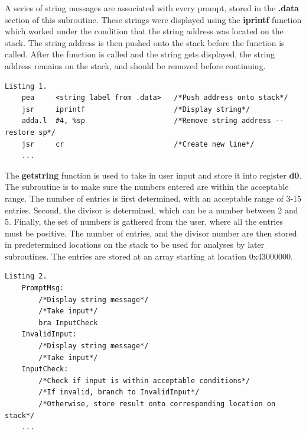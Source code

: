 \documentclass[12pt]{article}
\begin{document}
A series of string messages are associated with every prompt, stored in the \textbf{.data} section of this subroutine. These strings were displayed using the \textbf{iprintf} function which worked under the condition that the string address was located on the stack. The string address is then pushed onto the stack before the function is called. After the function is called and the string gets displayed, the string address remains on the stack, and should be removed before continuing.

\begin{verbatim}
Listing 1.
    pea     <string label from .data>   /*Push address onto stack*/
    jsr     iprintf                     /*Display string*/
    adda.l  #4, %sp                     /*Remove string address -- restore sp*/
    jsr     cr                          /*Create new line*/
    ...
\end{verbatim}

The \textbf{getstring} function is used to take in user input and store it into register \textbf{d0}. The subroutine is to make sure the numbers entered are within the acceptable range. The number of entries is first determined, with an acceptable range of 3-15 entries. Second, the divisor is determined, which can be a number between 2 and 5. Finally, the set of numbers is gathered from the user, where all the entries must be positive. The number of entries, and the divisor number are then stored in predetermined locations on the stack to be used for analyses by later subroutines. The entries are stored at an array starting at location 0x43000000.

\begin{verbatim}
Listing 2.
    PromptMsg:
        /*Display string message*/
        /*Take input*/
        bra InputCheck
    InvalidInput:
        /*Display string message*/
        /*Take input*/
    InputCheck:
        /*Check if input is within acceptable conditions*/
        /*If invalid, branch to InvalidInput*/
        /*Otherwise, store result onto corresponding location on stack*/
    ...
\end{verbatim}
\end{document}
